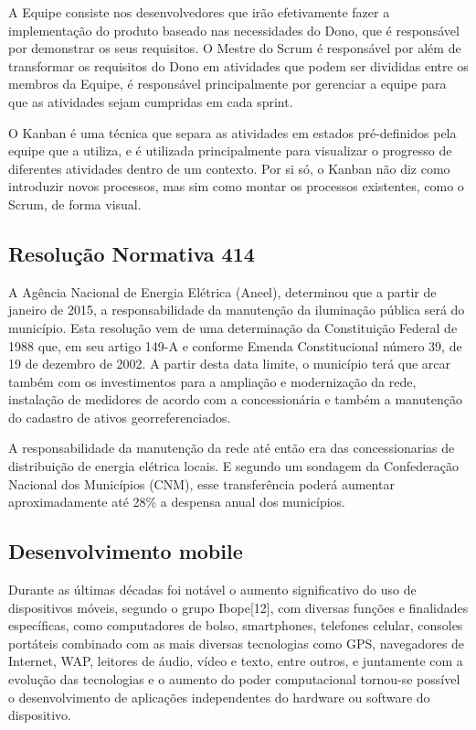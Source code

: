 \documentclass[
	article,			%
	11pt,				%
	oneside,			%
	a4paper,			%
	english,			%
	brazil,				%
	sumario=tradicional
	]{abntex2}
\begin{document}
A Equipe consiste nos desenvolvedores que irão efetivamente fazer a
implementação do produto baseado nas necessidades do Dono, que é responsável por
demonstrar os seus requisitos. O Mestre do Scrum é responsável por além de
transformar os requisitos do Dono em atividades que podem ser divididas entre os
membros da Equipe, é responsável principalmente por gerenciar a equipe para que
as atividades sejam cumpridas em cada sprint. \cite{scrum}

O Kanban é uma técnica que separa as atividades em estados pré-definidos pela
equipe que a utiliza, e é utilizada principalmente para visualizar o progresso
de diferentes atividades dentro de um contexto. Por si só, o Kanban não diz como
introduzir novos processos, mas sim como montar os processos existentes, como o
Scrum, de forma visual.

\subsection{Resolução Normativa 414}

A Agência Nacional de Energia Elétrica (Aneel), determinou que a partir de janeiro
de 2015, a responsabilidade da manutenção da iluminação pública será do município.
Esta resolução vem de uma determinação da Constituição Federal de 1988 que,
em seu artigo 149-A e conforme Emenda Constitucional número 39, de 19 de dezembro
de 2002. A partir desta data limite, o município terá que arcar também com os
investimentos para a ampliação e modernização da rede, instalação de medidores
de acordo com a concessionária e também a manutenção do cadastro de ativos
georreferenciados.

A responsabilidade da manutenção da rede até então era das concessionarias de
distribuição de energia elétrica locais. E segundo um sondagem da Confederação
Nacional dos Municípios (CNM), esse transferência poderá aumentar aproximadamente
até 28\% a despensa anual dos municípios.\cite{cdu}

\subsection{Desenvolvimento mobile}

Durante as últimas décadas foi notável o aumento significativo do uso de
dispositivos móveis, segundo o grupo Ibope[12], com diversas funções e finalidades
 específicas, como computadores de bolso, smartphones, telefones celular,
 consoles portáteis combinado com as mais diversas tecnologias como GPS,
 navegadores de Internet, WAP, leitores de áudio, vídeo e texto, entre outros,
 e juntamente com a evolução das tecnologias e o aumento do poder computacional
 tornou-se possível o desenvolvimento de aplicações independentes do hardware ou
 software do dispositivo.
\end{document}
